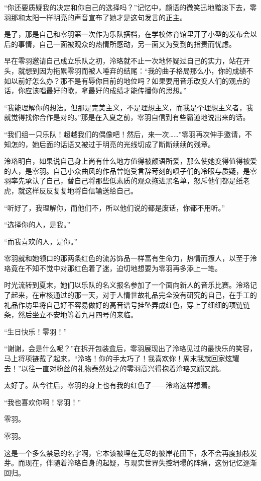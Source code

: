 \documentclass[UTF8, scheme = chinese, openany]{ctexbook}
\begin{document}
“你还要质疑我的决定和你自己的选择吗？”记忆中，颜语的微笑迅地黯淡下去，零羽那和太阳一样明亮的声音宣布了她才是这句发言的正主。

是了，那是自己和零羽第一次作为乐队搭档，在学校体育馆里开了小型的发布会以后的事情，自己一面被观众的热情所感动，另一面又为受到的指责而忧虑。

早在零羽邀请自己成立乐队之初，泠珞就不止一次地怀疑过自己的实力，站在开头，就想到因为拖累零羽而被人唾弃的结尾：“我的曲子格局那么小，你的成绩不如以前好怎么办？那不是有辱你目前的地位吗？如果要用音乐改变人们的观点的话，你应该唱最好的歌，拿最好的成绩才能传播你的思想。”

“我能理解你的想法。但那是完美主义，不是理想主义，而我是个理想主义者，我就觉得找你合作是对的。”那是在入夏之前，零羽自信到有些霸道地说出来的话。

“我们组一只乐队！超越我们的偶像吧！然后，来一次……”零羽再次伸手邀请，不知怎的，她后面的话语又被过于明亮的光线切成了断断续续的残章。

泠珞明白，如果说自己身上尚有什么地方值得被颜语所爱，那么使她变得值得被爱的人，是零羽。自己小众曲风的作品曾饱受言辞苛刻的喷子们的冷眼与质疑，是零羽率先承认了自己，替自己将那些低素质的观众拖进黑名单，怒斥他们都是纸老虎，就这样反反复复地将自信输送给自己。

“听好了，我理解你，而他们不，所以他们说的都是废话，你都不用听。”

“选择你的人，是我。”

“而我喜欢的人，是你。”

零羽就和她领口的那两条红色的流苏饰品一样富有生命力，热情而撩人，以至于泠珞竟在不知不觉中对那红色着了迷，迫切地想要为零羽再多添上一笔。

时光流转到夏末，她们以乐队的名义报名参加了一个面向新人的音乐比赛。泠珞记了起来，在审核通过的那一天，对于人情世故礼品完全没有研究的自己，在手工的礼品作坊里将自己好不容易做好的高音谱号挂坠弄成红色，穿上了细细的项链链条，然后坐立不安地等着九月四号的来临。

“生日快乐！零羽！”

“谢谢，会是什么呢？”在拆开包装盒后，零羽展现出了泠珞见过的最快乐的笑容，马上将项链戴了起来，“泠珞！你的手太巧了！我喜欢你！周末我就回家炫耀去！”以往一直对粉丝的礼物泰然处之的零羽高兴得抱着泠珞又蹦又跳。

太好了。从今往后，零羽的身上也有我的红色了——泠珞这样想着。

“我也喜欢你啊！零羽！”

零羽。

零羽。

这是一个多么禁忌的名字啊，它本该被埋在无尽的彼岸花田下，永不会再度抽枝发芽。而现在，伴随着泠珞自身的起疑，与现实世界失控坍塌的阵痛，这份记忆逐渐回归。
\end{document}

